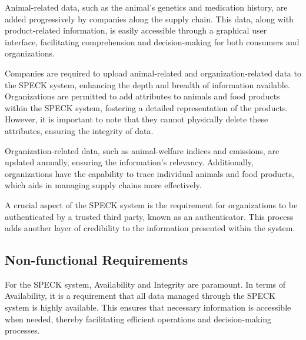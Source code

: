 \documentclass[oneside,a4paper,12pt, colorinlistoftodos]{article} %
\begin{document}
Animal-related data, such as the animal's genetics and medication history, are added progressively by companies along the supply chain. This data, along with product-related information, is easily accessible through a graphical user interface, facilitating comprehension and decision-making for both consumers and organizations.

Companies are required to upload animal-related and organization-related data to the SPECK system, enhancing the depth and breadth of information available. Organizations are permitted to add attributes to animals and food products within the SPECK system, fostering a detailed representation of the products. However, it is important to note that they cannot physically delete these attributes, ensuring the integrity of data.

Organization-related data, such as animal-welfare indices and emissions, are updated annually, ensuring the information's relevancy. Additionally, organizations have the capability to trace individual animals and food products, which aids in managing supply chains more effectively.

A crucial aspect of the SPECK system is the requirement for organizations to be authenticated by a trusted third party, known as an authenticator. This process adds another layer of credibility to the information presented within the system.


\subsection{Non-functional Requirements}



For the SPECK system, Availability and Integrity are paramount. In terms of Availability, it is a requirement that all data managed through the SPECK system is highly available. This ensures that necessary information is accessible when needed, thereby facilitating efficient operations and decision-making processes.
\end{document}
